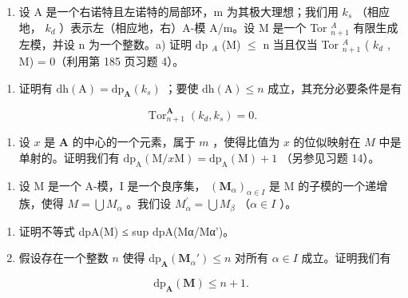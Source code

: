 \begin{enumerate}
\def\labelenumi{\arabic{enumi})}
\setcounter{enumi}{15}
\tightlist
\item
  设 A 是一个右诺特且左诺特的局部环，m 为其极大理想；我们用 \(k_{s}\) （相应地， \(k_{d}\) ）表示左（相应地，右）A-模 A/m。设 M 是一个 Tor \(_{n+1}^{A}\) 有限生成左模，并设 n 为一个整数。a) 证明 dp \(_{A}\) (M) \(\leqslant\) n 当且仅当 Tor \(_{n+1}^{A}\) ( \(k_{d}\) , M) = 0（利用第 185 页习题 4）。
\end{enumerate}

\begin{enumerate}
\def\labelenumi{\alph{enumi})}
\setcounter{enumi}{1}
\tightlist
\item
  证明有 \(\mathrm{dh(A)} = \mathrm{dp}_{\mathbf{A}}(k_s)\) ；要使 \(\mathrm{dh(A)} \leqslant n\) 成立，其充分必要条件是有
\end{enumerate}

\[
\operatorname{Tor} _ {n + 1} ^ {\mathbf {A}} \left(k _ {d}, k _ {s}\right) = 0.
\]

\begin{enumerate}
\def\labelenumi{\alph{enumi})}
\setcounter{enumi}{2}
\tightlist
\item
  设 \(x\) 是 \(\mathbf{A}\) 的中心的一个元素，属于 \(m\) ，使得比值为 \(x\) 的位似映射在 \(M\) 中是单射的。证明我们有 \(\mathrm{dp}_{\mathrm{A}}(\mathrm{M}/x\mathrm{M}) = \mathrm{dp}_{\mathrm{A}}(\mathrm{M}) + 1\) （另参见习题 14）。
\end{enumerate}

\begin{enumerate}
\def\labelenumi{\arabic{enumi})}
\setcounter{enumi}{16}
\tightlist
\item
  设 M 是一个 A-模，I 是一个良序集， \((\mathbf{M}_{\alpha})_{\alpha \in I}\) 是 M 的子模的一个递增族，使得 \(M = \bigcup M_{\alpha}\) 。我们设 \(M_{\alpha}^{\prime} = \bigcup M_{\beta}\) （\(\alpha \in I\) ）。
\end{enumerate}

\begin{enumerate}
\def\labelenumi{\alph{enumi})}
\item
  证明不等式 dpA(M) ≤ sup dpA(Mα/Mα')。
\item
  假设存在一个整数 \(n\) 使得 \(\mathrm{dp}_{\mathbf{A}}(\mathbf{M}_{\alpha}') \leqslant n\) 对所有 \(\alpha \in I\) 成立。证明我们有
\end{enumerate}

\[
\mathrm{dp} _ {\mathbf {A}} (\mathbf {M}) \leqslant n + 1.
\]


